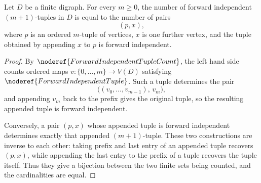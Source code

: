 \begin{helper}
Let \(D\) be a finite digraph.  For every \(m\ge0\), the number of forward
independent \((m+1)\)-tuples in \(D\) is equal to the number of pairs
\[
  (p,x),
\]
where \(p\) is an ordered \(m\)-tuple of vertices, \(x\) is one further
vertex, and the tuple obtained by appending \(x\) to \(p\) is forward
independent.
\end{helper}
\begin{proof}
By \(\noderef{ForwardIndependentTupleCount}\), the left hand side counts
ordered maps \(v:\{0,\ldots,m\}\to V(D)\) satisfying
\(\noderef{ForwardIndependentTuple}\).  Such a tuple determines the pair
\[
  \bigl((v_0,\ldots,v_{m-1}),\,v_m\bigr),
\]
and appending \(v_m\) back to the prefix gives the original tuple, so the
resulting appended tuple is forward independent.

Conversely, a pair \((p,x)\) whose appended tuple is forward independent
determines exactly that appended \((m+1)\)-tuple.  These two constructions
are inverse to each other: taking prefix and last entry of an appended tuple
recovers \((p,x)\), while appending the last entry to the prefix of a tuple
recovers the tuple itself.  Thus they give a bijection between the two
finite sets being counted, and the cardinalities are equal.
\end{proof}
